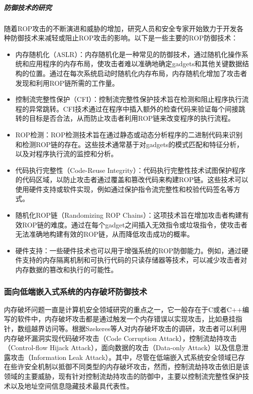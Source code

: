 \documentclass[12pt,a4paper]{ctexart}
\numberwithin{figure}{section}
\begin{document}
\subparagraph{防御技术的研究}
\par 随着ROP攻击的不断演进和威胁的增加，研究人员和安全专家开始致力于开发各种防御技术来减轻或阻止ROP攻击的影响。以下是一些主要的ROP防御技术：
\begin{itemize}
    \item 内存随机化（ASLR）：内存随机化是一种常见的防御技术，通过随机化操作系统和应用程序的内存布局，使攻击者难以准确地确定gadgets和其他关键数据结构的位置。通过在每次系统启动时随机化内存布局，内存随机化增加了攻击者发现和利用ROP链所需的工作量。
    \item 控制流完整性保护（CFI）：控制流完整性保护技术旨在检测和阻止程序执行流程的异常跳转。CFI技术通过在程序中插入额外的检查代码来验证每个间接跳转的目标是否合法，从而防止攻击者利用ROP链来改变程序的执行流程。
    \item ROP检测：ROP检测技术旨在通过静态或动态分析程序的二进制代码来识别和检测ROP链的存在。这些技术通常基于对gadgets的模式匹配和特征分析，以及对程序执行流的监控和分析。
    \item 代码执行完整性（Code-Reuse Integrity）：代码执行完整性技术试图保护程序的代码区域，以防止攻击者通过覆盖和篡改代码来构建ROP链。这些技术可以使用硬件支持或软件实现，例如通过保护指令流完整性和校验代码签名等方式。
    \item 随机化ROP链（Randomizing ROP Chains）：这项技术旨在增加攻击者构建有效ROP链的难度。通过在每个gadget之间插入无效指令或垃圾指令，使攻击者无法准确地构建有效的ROP链，从而降低攻击成功的概率。
    \item 硬件支持：一些硬件技术也可以用于增强系统的ROP防御能力。例如，通过硬件支持的内存隔离机制和可执行代码的只读存储器等技术，可以减少攻击者对内存数据的篡改和执行的可能性。
\end{itemize}

\subsubsection{面向低端嵌入式系统的内存破坏防御技术}
\par 内存破坏问题一直是计算机安全领域研究的重点之一，它一般存在于C或者C++编写的软件中，内存破坏攻击都是通过触发一个内存错误以实现攻击，比如悬挂指针，数组越界访问等。根据Szekeres\cite{6547101}等人对内存破坏攻击的调研，攻击者可以利用内存破坏漏洞实现代码破坏攻击（Code Corruption Attack），控制流劫持攻击（Control-flow Hijack Attack），面向数据的攻击（Data-only Attack）以及信息泄露攻击（Information Leak Attack）。其中，尽管在低端嵌入式系统安全领域已存在些许安全机制以抵御不同类型的内存破坏攻击\cite{7958583,8806725,almakhdhub2020mu}，然而，控制流劫持攻击依旧是该领域的主要威胁，现有针对控制流劫持攻击的防御中，主要以控制流完整性保护技术以及地址空间信息隐藏技术最具代表性。
\end{document}
